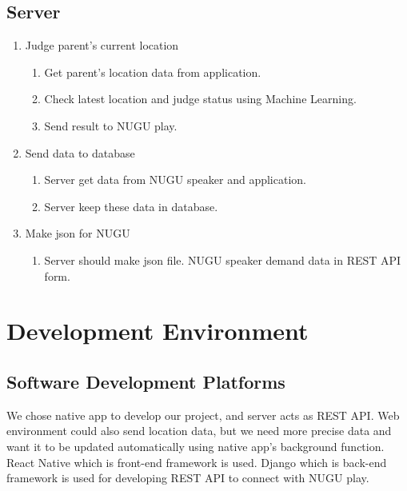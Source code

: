 \documentclass[conference]{IEEEtran}
\begin{document}
\subsection{Server}
\begin{enumerate}
    \item Judge parent’s current location
    \begin{enumerate}
        \item Get parent’s location data from application.
        \item Check latest location and judge status using Machine Learning.
        \item Send result to NUGU play.\\
    \end{enumerate}
    \item Send data to database
    \begin{enumerate}
        \item Server get data from NUGU speaker and application.
        \item Server keep these data in database.
    \end{enumerate}
    \item Make json for NUGU
    \begin{enumerate}
        \item Server should make json file. NUGU speaker demand data in REST API form.\\
    \end{enumerate}
\end{enumerate}

\section{Development Environment}
\subsection{Software Development Platforms}
We chose native app to develop our project, and server acts as REST API. Web environment could also send location data, but we need more precise data and want it to be updated automatically using native app’s background function. React Native which is front-end framework is used. Django which is back-end framework is used for developing REST API to connect with NUGU play.
\end{document}

